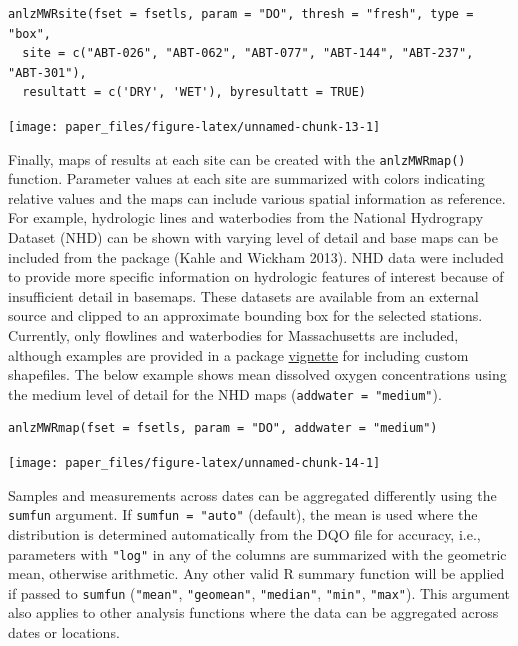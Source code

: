 \begin{verbatim}
anlzMWRsite(fset = fsetls, param = "DO", thresh = "fresh", type = "box", 
  site = c("ABT-026", "ABT-062", "ABT-077", "ABT-144", "ABT-237", "ABT-301"),
  resultatt = c('DRY', 'WET'), byresultatt = TRUE)
\end{verbatim}

\texttt{[image: paper\_files/figure-latex/unnamed-chunk-13-1]}

Finally, maps of results at each site can be created with the \texttt{anlzMWRmap()} function. Parameter values at each site are summarized with colors indicating relative values and the maps can include various spatial information as reference. For example, hydrologic lines and waterbodies from the National Hydrograpy Dataset (NHD) can be shown with varying level of detail and base maps can be included from the  package (Kahle and Wickham 2013). NHD data were included to provide more specific information on hydrologic features of interest because of insufficient detail in basemaps. These datasets are available from an external source and clipped to an approximate bounding box for the selected stations. Currently, only flowlines and waterbodies for Massachusetts are included, although examples are provided in a package \href{https://massbays-tech.github.io/MassWateR/articles/modifying.html\#modifying-masswater-plots}{vignette} for including custom shapefiles. The below example shows mean dissolved oxygen concentrations using the medium level of detail for the NHD maps (\texttt{addwater\ =\ "medium"}).

\begin{verbatim}
anlzMWRmap(fset = fsetls, param = "DO", addwater = "medium")
\end{verbatim}

\texttt{[image: paper\_files/figure-latex/unnamed-chunk-14-1]}

Samples and measurements across dates can be aggregated differently using the \texttt{sumfun} argument. If \texttt{sumfun\ =\ "auto"} (default), the mean is used where the distribution is determined automatically from the DQO file for accuracy, i.e., parameters with \texttt{"log"} in any of the columns are summarized with the geometric mean, otherwise arithmetic. Any other valid R summary function will be applied if passed to \texttt{sumfun} (\texttt{"mean"}, \texttt{"geomean"}, \texttt{"median"}, \texttt{"min"}, \texttt{"max"}). This argument also applies to other analysis functions where the data can be aggregated across dates or locations.

